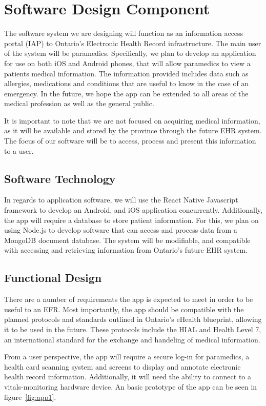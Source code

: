 
\section{Software Design Component}

The software system we are designing will function as an information access portal (IAP) to Ontario's Electronic Health Record infrastructure. The main user of the system will be paramedics. Specifically, we plan to develop an application for use on both iOS and Android phones, that will allow paramedics to view a patients medical information. The information provided includes data such as allergies, medications and conditions that are useful to know in the case of an emergency. In the future, we hope the app can be extended to all areas of the medical profession as well as the general public.

It is important to note that we are not focused on acquiring medical information, as it will be available and stored by the province through the future EHR system. The focus of our software will be to access, process and present this information to a user.

\subsection{Software Technology}
In regards to application software, we will use the React Native Javascript framework to develop an Android, and iOS application concurrently. Additionally, the app will require a database to store patient information. For this, we plan on using Node.js to develop software that can access and process data from a MongoDB document database. The system will be modifiable, and compatible with accessing and retrieving information from Ontario's future EHR system.

\subsection{Functional Design}

There are a number of requirements the app is expected to meet in order to be useful to an EFR. Most importantly, the app should be compatible with the planned protocols and standards outlined in Ontario's eHealth blueprint, allowing it to be used in the future. These protocols include the HIAL and Health Level 7, an international standard for the exchange and handeling of medical information.

From a user perspective, the app will require a secure log-in for paramedics, a health card scanning system and screens to display and annotate electronic health record information. Additionally, it will need the ability to connect to a vitals-monitoring hardware device. An basic prototype of the app can be seen in figure~\ref{fig:app1}.

